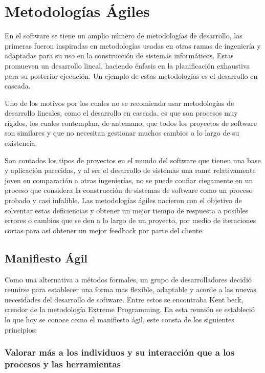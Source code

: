 \section{Metodologías Ágiles}

En el software se tiene un amplio número de metodologías de desarrollo, las
primeras fueron inspiradas en metodologías usadas en otras ramas de ingeniería
y adaptadas para su uso en la construcción de sistemas informáticos. Estas
promueven un desarrollo lineal, haciendo énfasis en la planificación exhaustiva
para su posterior ejecución. Un ejemplo de estas metodologías es el desarrollo
en cascada.

Uno de los motivos por los cuales no se recomienda usar metodologías de
desarrollo lineales, como el desarrollo en cascada, es que son procesos muy
rígidos,  los cuales  contemplan, de antemano, que todos los proyectos de
software son similares y que no necesitan gestionar muchos cambios a lo largo
de su existencia.

Son contados los tipos de proyectos en el mundo del software que tienen una
base y aplicación parecidas, y al ser el desarrollo de sistemas una rama
relativamente joven en comparación a otras ingenierías, no se puede confiar
ciegamente en un proceso que considera la construcción de sistemas de software
como un proceso probado y casi infalible. Las metodologías ágiles nacieron con
el objetivo de solventar estas deficiencias y obtener un mejor tiempo de
respuesta a posibles errores o cambios que se den a lo largo de un proyecto,
por medio de iteraciones cortas para así obtener un mejor feedback por parte
del cliente.

\subsection{Manifiesto Ágil}

Como una alternativa a métodos formales, un grupo de desarrolladores decidió
reunirse para establecer una forma mas flexible, adaptable y
acorde a las nuevas necesidades del desarrollo de software. Entre estos
se encontraba Kent beck, creador de la metodología Extreme Programming.
En esta reunión se estableció lo que hoy se conoce como el manifiesto
ágil, este consta de los siguientes principios:

\subsubsection{Valorar más a los individuos y su interacción que a los procesos y las herramientas}

